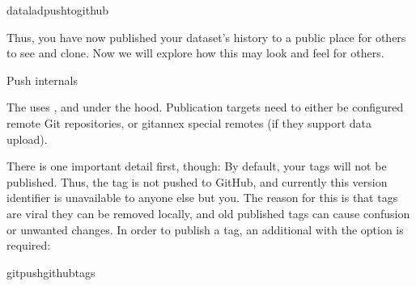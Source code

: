 \begin{sphinxVerbatim}[commandchars=\\\{\}]
dataladpush\PYGZhy{}\PYGZhy{}togithub
\end{sphinxVerbatim}

\sphinxAtStartPar
Thus, you have now published your dataset’s history to a public place for others
to see and clone. Now we will explore how this may look and feel for others.
\begin{gitusernote}[before title={\thetcbcounter\ }, check odd page=true]{Push internals}

\sphinxAtStartPar
The  uses , and  under
the hood. Publication targets need to either be configured remote Git repositories,
or git\sphinxhyphen{}annex special remotes (if they support data upload).


\end{gitusernote}

\sphinxAtStartPar
There is one important detail first, though: By default, your tags will not be published.
Thus, the tag  is not pushed to GitHub, and currently this
version identifier is unavailable to anyone else but you.
The reason for this is that tags are viral \textendash{} they can be removed locally, and old
published tags can cause confusion or unwanted changes. In order to publish a tag,
an additional   with the  option is required:

\ignorespaces 
\def\sphinxLiteralBlockLabel{\label{\detokenize{basics/101-130-yodaproject:index-18}}}
\begin{sphinxVerbatim}[commandchars=\\\{\}]
gitpushgithub\PYGZhy{}\PYGZhy{}tags
\end{sphinxVerbatim}

